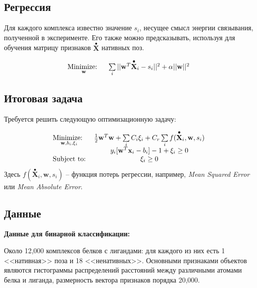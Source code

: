 \documentclass[CEJM,PDF]{Class+Reg_in_Molec_Docking} %
\begin{document}
\subsection{Регрессия}

Для каждого комплекса известно значение $s_i$, несущее смысл энергии связывания, полученной в эксперименте. Его также можно предсказывать, используя для обучения матрицу признаков $\overset{\bullet}{\mathbf{X}}$ нативных поз.

\begin{eqnarray}
\begin{tabular}{lc}
$\underset{\mathbf{w}}{\text{Minimize: } }$&$ \sum\limits_{i}||\mathbf{w}^T\overset{\bullet}{\mathbf{X}}_i - s_i||^2 + \alpha||\mathbf{w}||^2$ \\ 
\end{tabular}
\label{eq:primal} 
\end{eqnarray}


\subsection{Итоговая задача}

Требуется решить следующую оптимизационную задачу:

\begin{eqnarray}
\begin{tabular}{lc}
$\underset{\mathbf{w}, b_i, \xi_{i}}{\text{Minimize: }}$ &$ \frac{1}{2} \mathbf{w}^T\mathbf{w} + \sum\limits_{i}C_{i}\xi_{i} + C_{r}\sum\limits_{i} f(\overset{\bullet}{\mathbf{X}}_i,\mathbf{w}, s_i)$ \\ 
\multirow{3}{*}{Subject to:}
&$y_{i}[\mathbf{w}^T\mathbf{x}_{i} - b_i]-1+\xi_{i} \geq 0$\\
&$\xi_{i} \geq 0$
\end{tabular}
\label{eq:primalboth} 
\end{eqnarray}
Здесь $f(\overset{\bullet}{\mathbf{X}}_i,\mathbf{w}, s_i)$ -- функция потерь регрессии, например, \textit{Mean Squared Error} или \textit{Mean Absolute Error}.

\subsection{Данные}

\textbf{Данные для бинарной классификации:}
\medskip

Около 12,000 комплексов белков с лигандами: для каждого из них есть 1 <<нативная>> поза и 18 <<ненативных>>. Основными признаками объектов являются гистограммы распределений расстояний между различными атомами белка и лиганда, размерность вектора признаков порядка 20,000.
\end{document}
